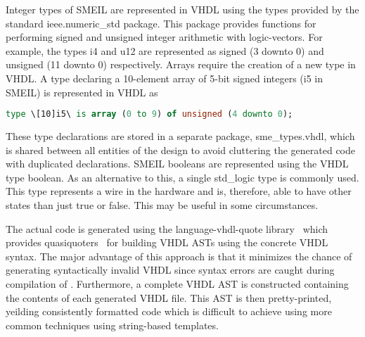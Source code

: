 Integer types of SMEIL are represented in VHDL using the types provided by the
standard {\ttfamily ieee.numeric\_std} package. This package provides functions for
performing signed and unsigned integer arithmetic with logic-vectors. For
example, the types {\ttfamily i4} and {\ttfamily u12} are represented as {\ttfamily signed (3
  downto 0)} and {\ttfamily unsigned (11 downto 0)} respectively. Arrays require the
creation of a new {\ttfamily type} in VHDL. A {\ttfamily type} declaring a 10-element array
of 5-bit signed integers ({\ttfamily [10]i5} in SMEIL) is represented in VHDL as
\begin{lstlisting}[language=vhdl]
type \[10]i5\ is array (0 to 9) of unsigned (4 downto 0);
\end{lstlisting}
These type declarations are stored in a separate package, {\ttfamily sme\_types.vhdl},
which is shared between all entities of the design to avoid cluttering the
generated code with duplicated declarations. SMEIL booleans are represented
using the VHDL type {\ttfamily boolean}. As an alternative to this, a single {\ttfamily
  std\_logic} type is commonly used. This type represents a wire in the hardware
and is, therefore, able to have other states than just true or false. This may
be useful in some circumstances.

The actual code is generated using the {\ttfamily language-vhdl-quote}
library~\cite{language-vhdl-quote} which provides
quasiquoters~\cite{mainland2007s} for building VHDL ASTs using the concrete VHDL
syntax. The major advantage of this approach is that it minimizes the chance of
generating syntactically invalid VHDL since syntax errors are caught during
compilation of \libsme{}. Furthermore, a complete VHDL AST is constructed
containing the contents of each generated VHDL file. This AST is then
pretty-printed, yeilding consistently formatted code which is difficult to
achieve using more common techniques using string-based templates.


